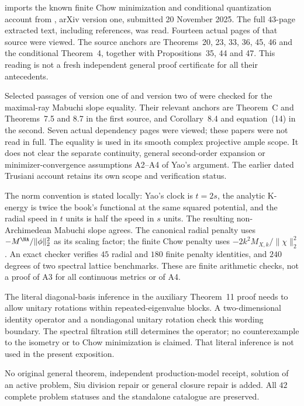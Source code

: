  imports the known finite
Chow minimization and conditional quantization account from
\cite{Yao25MaximalDestabilizers}, arXiv version one, submitted
20 November 2025. The full $43$-page extracted text, including
references, was read. Fourteen actual pages of that source were
viewed. The source anchors are Theorems~20, 23, 33, 36, 45, 46
and the conditional Theorem~4, together with Propositions~35,
44 and 47. This reading is not a fresh independent general
proof certificate for all their antecedents.

Selected passages of version one of \cite{BJ25WeightedYTD}
and version two of \cite{DarvasZhang25YTD} were checked for
the maximal-ray Mabuchi slope equality. Their relevant
anchors are Theorem~C and Theorems~7.5 and 8.7 in the first
source, and Corollary~8.4 and equation~(14) in the second.
Seven actual dependency pages were viewed; these papers
were not read in full. The equality is used in its smooth
complex projective ample scope. It does not clear the
separate continuity, general second-order expansion or
minimizer-convergence assumptions A2--A4 of Yao's argument.
The earlier dated Trusiani account retains its own scope
and verification status.

The norm convention is stated locally: Yao's clock is
$t=2s$, the analytic K-energy is twice the book's functional
at the same squared potential, and the radial speed in
$t$ units is half the speed in $s$ units. The resulting
non-Archimedean Mabuchi slope agrees. The canonical radial
penalty uses $-M^{\NA}/\|\phi\|_2^2$ as its scaling factor;
the finite Chow penalty uses $-2k^2M_{X,k}/\|\chi\|_2^2$.
An exact checker verifies $45$ radial and $180$ finite
penalty identities, and $240$ degrees of two spectral
lattice benchmarks. These are finite arithmetic checks,
not a proof of A3 for all continuous metrics or of A4.

The literal diagonal-basis inference in the auxiliary
Theorem~11 proof needs to allow unitary rotations within
repeated-eigenvalue blocks. A two-dimensional identity
operator and a nondiagonal unitary rotation check this
wording boundary. The spectral filtration still determines
the operator; no counterexample to the isometry or to
Chow minimization is claimed. That literal inference is
not used in the present exposition.

No original general theorem, independent production-model
receipt, solution of an active problem, Siu division repair
or general closure repair is added. All $42$ complete
problem statuses and the standalone catalogue are preserved.

